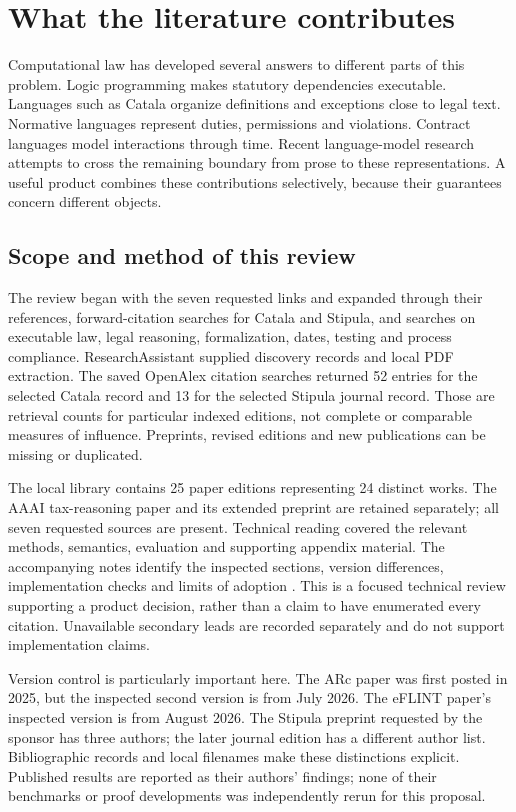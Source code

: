 \section{What the literature contributes}
\label{sec:literature}

Computational law has developed several answers to different parts of this
problem. Logic programming makes statutory dependencies executable. Languages
such as Catala organize definitions and exceptions close to legal text. Normative
languages represent duties, permissions and violations. Contract languages model
interactions through time. Recent language-model research attempts to cross the
remaining boundary from prose to these representations. A useful product combines
these contributions selectively, because their guarantees concern different
objects.

\subsection{Scope and method of this review}

The review began with the seven requested links and expanded through their
references, forward-citation searches for Catala and Stipula, and searches on
executable law, legal reasoning, formalization, dates, testing and process
compliance. ResearchAssistant supplied discovery records and local PDF extraction.
The saved OpenAlex citation searches returned 52 entries for the selected Catala
record and 13 for the selected Stipula journal record. Those are retrieval counts
for particular indexed editions, not complete or comparable measures of influence.
Preprints, revised editions and new publications can be missing or duplicated.

The local library contains 25 paper editions representing 24 distinct works.
The AAAI tax-reasoning paper and its extended preprint are retained separately;
all seven requested sources are present. Technical reading covered the relevant
methods, semantics, evaluation and supporting appendix material. The accompanying
notes identify the inspected sections, version differences, implementation checks
and limits of adoption \citep{libraryreview}. This is a focused technical review
supporting a product decision, rather than a claim to have enumerated every
citation. Unavailable secondary leads are recorded separately and do not support
implementation claims.

Version control is particularly important here. The ARc paper was first posted
in 2025, but the inspected second version is from July 2026. The eFLINT paper's
inspected version is from August 2026. The Stipula preprint requested by the
sponsor has three authors; the later journal edition has a different author list.
Bibliographic records and local filenames make these distinctions explicit.
Published results are reported as their authors' findings; none of their
benchmarks or proof developments was independently rerun for this proposal.

